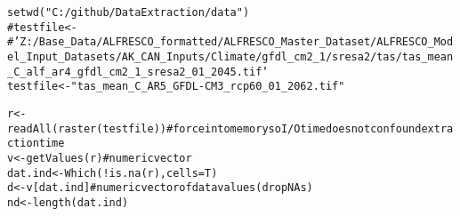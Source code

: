 \documentclass{article}\usepackage[]{graphicx}\usepackage[]{color}
\makeatletter
\newcommand{\hlstr}[1]{\textcolor[rgb]{0.863,0.196,0.184}{#1}}%
\newcommand{\hlcom}[1]{\textcolor[rgb]{0.345,0.431,0.459}{#1}}%
\newcommand{\hlopt}[1]{\textcolor[rgb]{0.576,0.631,0.631}{#1}}%
\newcommand{\hlstd}[1]{\textcolor[rgb]{0.514,0.58,0.588}{#1}}%
\newcommand{\hlkwb}[1]{\textcolor[rgb]{0.522,0.6,0}{#1}}%
\newcommand{\hlkwc}[1]{\textcolor[rgb]{0.796,0.294,0.086}{#1}}%
\newcommand{\hlkwd}[1]{\textcolor[rgb]{0.576,0.631,0.631}{#1}}%
\newenvironment{kframe}{%
 \def\at@end@of@kframe{}%
 \ifinner\ifhmode%
  \def\at@end@of@kframe{\end{minipage}}%
  \begin{minipage}{\columnwidth}%
 \fi\fi%
 \def\FrameCommand##1{\hskip\@totalleftmargin \hskip-\fboxsep
 \colorbox{shadecolor}{##1}\hskip-\fboxsep
     \hskip-\linewidth \hskip-\@totalleftmargin \hskip\columnwidth}%
 \MakeFramed {\advance\hsize-\width
   \@totalleftmargin\z@ \linewidth\hsize
   \@setminipage}}%
 {\par\unskip\endMakeFramed%
 \at@end@of@kframe}
\newenvironment{knitrout}{}{} %
\makeatother
\begin{document}
\begin{knitrout}
\color{fgcolor}\begin{kframe}
\begin{alltt}
\hlkwd{setwd}\hlstd{(}\hlstr{"C:/github/DataExtraction/data"}\hlstd{)}
\hlcom{# testfile <-}
\hlcom{# 'Z:/Base_Data/ALFRESCO_formatted/ALFRESCO_Master_Dataset/ALFRESCO_Model_Input_Datasets/AK_CAN_Inputs/Climate/gfdl_cm2_1/sresa2/tas/tas_mean_C_alf_ar4_gfdl_cm2_1_sresa2_01_2045.tif'}
\hlstd{testfile} \hlkwb{<-} \hlstr{"tas_mean_C_AR5_GFDL-CM3_rcp60_01_2062.tif"}

\hlstd{r} \hlkwb{<-} \hlkwd{readAll}\hlstd{(}\hlkwd{raster}\hlstd{(testfile))}  \hlcom{# force into memory so I/O time does not confound extraction time}
\hlstd{v} \hlkwb{<-} \hlkwd{getValues}\hlstd{(r)}  \hlcom{# numeric vector}
\hlstd{dat.ind} \hlkwb{<-} \hlkwd{Which}\hlstd{(}\hlopt{!}\hlkwd{is.na}\hlstd{(r),} \hlkwc{cells} \hlstd{= T)}
\hlstd{d} \hlkwb{<-} \hlstd{v[dat.ind]}  \hlcom{# numeric vector of data values (drop NAs)}
\hlstd{nd} \hlkwb{<-} \hlkwd{length}\hlstd{(dat.ind)}
\end{alltt}
\end{kframe}
\end{knitrout}
\end{document}
